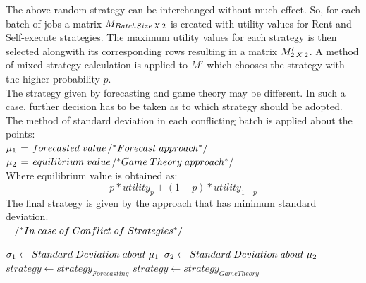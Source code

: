 \documentclass[conference]{IEEEtran}
\begin{document}
\vspace{0.2cm}
The above random strategy can be interchanged without much effect. So, for each batch of jobs a matrix $M_{Batch Size\hspace*{0.5mm}X\hspace*{0.5mm}2}$ is created with utility values for Rent and Self-execute strategies. The maximum utility values for each strategy is then selected alongwith its corresponding rows resulting in a matrix $M'_{2\hspace*{0.5mm}X\hspace*{0.5mm} 2}$. A method of mixed strategy calculation is applied to $M'$ which chooses the strategy with the higher probability $p$.\\[0.2cm]
The strategy given by forecasting and game theory may be different. In such a case, further decision has to be taken as to which strategy should be adopted. The method of standard deviation in each conflicting batch is applied about the points:\\[0.3cm]
$\mu_1\hspace*{0.5mm}=\hspace*{0.5mm}forecasted\hspace*{1mm}value$\hspace*{3.5mm}$/^\ast Forecast\hspace*{1mm} approach^\ast/$\\
$\mu_2\hspace*{0.5mm}=\hspace*{0.5mm}equilibrium\hspace*{1mm}value$\hspace*{2mm}$/^\ast Game\hspace*{1mm}Theory\hspace*{1mm}approach^\ast/$\\[0.3cm]
Where equilibrium value is obtained as:
\begin{displaymath}
p\ast utility_p + (1-p) \ast utility_{1-p}
\end{displaymath}
The final strategy is given by the approach that has minimum standard deviation.\\[0.3cm]
$\hspace*{3mm}/^\ast In\hspace*{1mm}case\hspace*{1mm}of\hspace*{1mm}Conflict\hspace*{1mm}of\hspace*{1mm}Strategies^\ast/$
\begin{algorithmic}
\STATE $\sigma_1 \gets Standard\hspace*{1mm}Deviation\hspace*{1mm}about\hspace*{1mm}\mu_1$
\STATE $\sigma_2 \gets Standard\hspace*{1mm}Deviation\hspace*{1mm}about\hspace*{1mm}\mu_2$
\vspace{0.2cm}
	\STATE $strategy \gets strategy_{Forecasting}$
\ELSE
	\STATE $strategy \gets strategy_{GameTheory}$
\ENDIF
\end{algorithmic}
\end{document}
